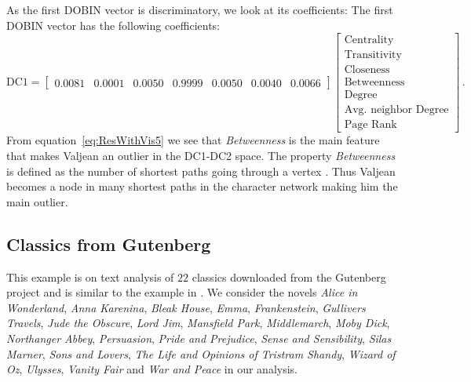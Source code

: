 \documentclass[letter,12pt]{article}
\begin{document}
As the first DOBIN vector is discriminatory, we look at its coefficients:
The first DOBIN vector has the following coefficients:
{\color{blue}
\begin{equation}\label{eq:ResWithVis5}
	\text{DC1} = \begin{bmatrix}
		0.0081 & 0.0001 & 0.0050 & 0.9999 & 0.0050 & 0.0040 & 0.0066
	\end{bmatrix}
	\begin{bmatrix}
		\text{Centrality}            \\
		\text{Transitivity}          \\
		\text{Closeness}             \\
		\text{Betweenness}           \\
		\text{Degree}                \\
		\text{Avg. neighbor Degree} \\
		\text{Page Rank}
	\end{bmatrix} \, .
\end{equation} }
From equation~\eqref{eq:ResWithVis5} we see that \textit{Betweenness} is the main feature that makes Valjean an outlier in the DC1-DC2 space. The property \textit{Betweenness} is defined as the number of shortest paths going through a vertex \citep{igraph}. Thus Valjean becomes a node in many shortest paths in the character network making him the main outlier.

\subsection{Classics from Gutenberg}\label{sec:ResWithVis6}

This example is on text analysis of $22$ classics downloaded from the Gutenberg project \citep{gutenberg} and is similar to the example in \cite{wilkinson2017visualizing}. We consider the novels \textit{Alice in Wonderland}, \textit{Anna Karenina}, \textit{Bleak House}, \textit{Emma}, \textit{Frankenstein}, \textit{Gullivers Travels}, \textit{Jude the Obscure}, \textit{Lord Jim}, \textit{Mansfield Park}, \textit{Middlemarch}, \textit{Moby Dick}, \textit{Northanger Abbey}, \textit{Persuasion}, \textit{Pride and Prejudice}, \textit{Sense and Sensibility}, \textit{Silas Marner}, \textit{Sons and Lovers}, \textit{The Life and Opinions of Tristram Shandy}, \textit{Wizard of Oz}, \textit{Ulysses}, \textit{Vanity Fair} and \textit{War and Peace} in our analysis.
\end{document}
